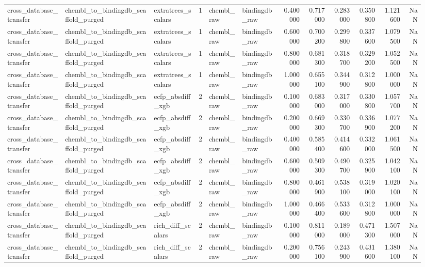 \begin{longtable}{lllrllrrrrrr}
cross\_database\_transfer & chembl\_to\_bindingdb\_scaffold\_purged & extratrees\_scalars & 1 & chembl\_raw & bindingdb\_raw & 0.400000 & 0.717000 & 0.283000 & 0.350800 & 1.121600 & NaN \\
cross\_database\_transfer & chembl\_to\_bindingdb\_scaffold\_purged & extratrees\_scalars & 1 & chembl\_raw & bindingdb\_raw & 0.600000 & 0.700200 & 0.299800 & 0.337600 & 1.079500 & NaN \\
cross\_database\_transfer & chembl\_to\_bindingdb\_scaffold\_purged & extratrees\_scalars & 1 & chembl\_raw & bindingdb\_raw & 0.800000 & 0.681300 & 0.318700 & 0.329200 & 1.052500 & NaN \\
cross\_database\_transfer & chembl\_to\_bindingdb\_scaffold\_purged & extratrees\_scalars & 1 & chembl\_raw & bindingdb\_raw & 1.000000 & 0.655100 & 0.344900 & 0.312800 & 1.000000 & NaN \\
cross\_database\_transfer & chembl\_to\_bindingdb\_scaffold\_purged & ecfp\_absdiff\_xgb & 2 & chembl\_raw & bindingdb\_raw & 0.100000 & 0.683000 & 0.317000 & 0.330800 & 1.057700 & NaN \\
cross\_database\_transfer & chembl\_to\_bindingdb\_scaffold\_purged & ecfp\_absdiff\_xgb & 2 & chembl\_raw & bindingdb\_raw & 0.200000 & 0.669300 & 0.330700 & 0.336900 & 1.077200 & NaN \\
cross\_database\_transfer & chembl\_to\_bindingdb\_scaffold\_purged & ecfp\_absdiff\_xgb & 2 & chembl\_raw & bindingdb\_raw & 0.400000 & 0.585400 & 0.414600 & 0.332000 & 1.061500 & NaN \\
cross\_database\_transfer & chembl\_to\_bindingdb\_scaffold\_purged & ecfp\_absdiff\_xgb & 2 & chembl\_raw & bindingdb\_raw & 0.600000 & 0.509300 & 0.490700 & 0.325900 & 1.042100 & NaN \\
cross\_database\_transfer & chembl\_to\_bindingdb\_scaffold\_purged & ecfp\_absdiff\_xgb & 2 & chembl\_raw & bindingdb\_raw & 0.800000 & 0.461900 & 0.538100 & 0.319000 & 1.020100 & NaN \\
cross\_database\_transfer & chembl\_to\_bindingdb\_scaffold\_purged & ecfp\_absdiff\_xgb & 2 & chembl\_raw & bindingdb\_raw & 1.000000 & 0.466400 & 0.533600 & 0.312800 & 1.000000 & NaN \\
cross\_database\_transfer & chembl\_to\_bindingdb\_scaffold\_purged & rich\_diff\_scalars & 2 & chembl\_raw & bindingdb\_raw & 0.100000 & 0.811000 & 0.189000 & 0.471300 & 1.507000 & NaN \\
cross\_database\_transfer & chembl\_to\_bindingdb\_scaffold\_purged & rich\_diff\_scalars & 2 & chembl\_raw & bindingdb\_raw & 0.200000 & 0.756100 & 0.243900 & 0.431600 & 1.380100 & NaN \\

\end{longtable}
